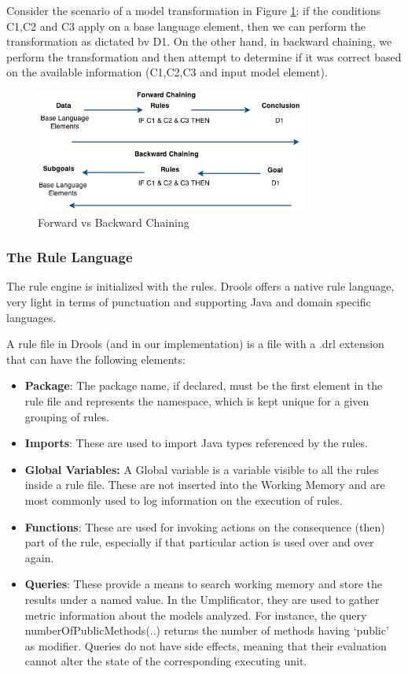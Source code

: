 Consider the scenario of a model transformation in Figure \ref{fig:backwardForward}: if the conditions C1,C2 and C3 apply on a base language element, then we can perform the transformation as dictated bv D1. 
On the other hand, in backward chaining, we perform the transformation and then attempt to determine if it was correct based on the available information (C1,C2,C3 and input model element).

\begin{figure}[h]
\centering
\includegraphics[width=0.80\textwidth]{Figures/ForwardBackwardChaining.png}
\caption{Forward vs Backward Chaining}
\label{fig:backwardForward}
\end{figure}

\subsubsection{The Rule Language}
The rule engine is initialized with the rules. Drools offers a native rule language, very light in terms of punctuation and supporting Java and domain specific languages. 

A rule file in Drools (and in our implementation) is a file with a .drl extension that can have the following elements:

\begin{itemize}
\item \textbf{Package}: The package name, if declared, must be the first element in the rule file and represents the namespace, which is kept unique for a given grouping of rules.
\item \textbf{Imports}: These are used to import Java types referenced by the rules.
\item \textbf{Global Variables:} A Global variable is a variable visible to all the rules inside a rule file. These are not inserted into the Working Memory and are most commonly used to log information on the execution of rules.
\item \textbf{Functions}: These are used for invoking actions on the consequence (then) part of the rule, especially if that particular action is used over and over again. 
\item \textbf{Queries}: These provide a means to search working memory and store the results under a named value. In the Umplificator, they are used to gather metric information about the models analyzed. For instance, the query  numberOfPublicMethods(..) returns the number of methods having `public' as modifier. Queries do not have side effects, meaning that their evaluation cannot alter the state of the corresponding executing unit. 
\end{itemize}

